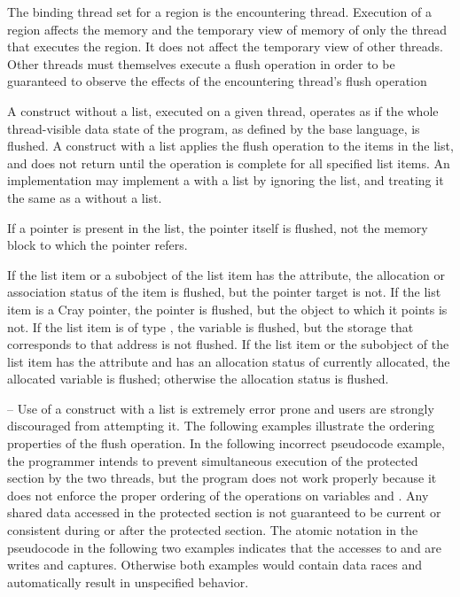 \binding
The binding thread set for a  region is the encountering thread. Execution of a 
 region affects the memory and the temporary view of memory of only the thread 
that executes the region. It does not affect the temporary view of other threads. Other 
threads must themselves execute a flush operation in order to be guaranteed to observe 
the effects of the encountering thread’s flush operation

\descr
A  construct without a list, executed on a given thread, operates as if the whole 
thread-visible data state of the program, as defined by the base language, is flushed. A 
 construct with a list applies the flush operation to the items in the list, and does 
not return until the operation is complete for all specified list items. An implementation 
may implement a  with a list by ignoring the list, and treating it the same as a 
 without a list.

\ccppspecificstart
If a pointer is present in the list, the pointer itself is flushed, not the memory block to 
which the pointer refers.
\ccppspecificend

\fortranspecificstart
If the list item or a subobject of the list item has the  attribute, the allocation 
or association status of the  item is flushed, but the pointer target is not. If the 
list item is a Cray pointer, the pointer is flushed, but the object to which it points is not. 
If the list item is of type , the variable is flushed, but the storage that corresponds 
to that address is not flushed. If the list item or the subobject of the list item has the 
 attribute and has an allocation status of currently allocated, the 
allocated variable is flushed; otherwise the allocation status is flushed.
\fortranspecificend

\begin{samepage}
\notestart
\noteheader – Use of a  construct with a list is extremely error prone and users are 
strongly discouraged from attempting it. The following examples illustrate the ordering 
properties of the flush operation. In the following incorrect pseudocode example, the 
programmer intends to prevent simultaneous execution of the protected section by the 
two threads, but the program does not work properly because it does not enforce the 
proper ordering of the operations on variables  and . Any shared data accessed in the 
protected section is not guaranteed to be current or consistent during or after the 
protected section. The atomic notation in the pseudocode in the following two examples 
indicates that the accesses to  and  are  writes and captures. Otherwise both 
examples would contain data races and automatically result in unspecified behavior. 
\end{samepage}

